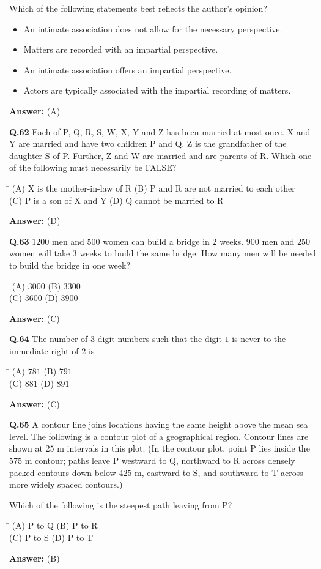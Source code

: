 \documentclass[11pt,a4paper]{article}
\newcommand{\optsfourA}[4]{%
  \begin{tabbing}
    \hspace{0.48\linewidth}\=\kill
    (A) #1 \> (B) #2 \\[2pt]
    (C) #3 \> (D) #4
  \end{tabbing}%
}
\newcommand{\optslistA}[4]{%
  \begin{itemize}
    \setlength{\itemsep}{2pt}\setlength{\parskip}{0pt}
    \item[(A)] #1
    \item[(B)] #2
    \item[(C)] #3
    \item[(D)] #4
  \end{itemize}%
}
\newcommand{\ans}[1]{\textbf{Answer:} #1\par\medskip}
\begin{document}
Which of the following statements best reflects the author's opinion?
\optslistA{An intimate association does not allow for the necessary perspective.}{Matters are recorded with an impartial perspective.}{An intimate association offers an impartial perspective.}{Actors are typically associated with the impartial recording of matters.}
\ans{(A)}

\textbf{Q.62} Each of P, Q, R, S, W, X, Y and Z has been married at most once. X and Y are married and have two children P and Q. Z is the grandfather of the daughter S of P. Further, Z and W are married and are parents of R. Which one of the following must necessarily be FALSE?
\optsfourA{X is the mother-in-law of R}{P and R are not married to each other}{P is a son of X and Y}{Q cannot be married to R}
\ans{(D)}

\textbf{Q.63} $1200$ men and $500$ women can build a bridge in $2$ weeks. $900$ men and $250$ women will take $3$ weeks to build the same bridge. How many men will be needed to build the bridge in one week?
\optsfourA{$3000$}{$3300$}{$3600$}{$3900$}
\ans{(C)}

\textbf{Q.64} The number of $3$-digit numbers such that the digit $1$ is never to the immediate right of $2$ is
\optsfourA{$781$}{$791$}{$881$}{$891$}
\ans{(C)}

\textbf{Q.65} A contour line joins locations having the same height above the mean sea level. The following is a contour plot of a geographical region. Contour lines are shown at $25\text{ m}$ intervals in this plot. (In the contour plot, point P lies inside the $575\text{ m}$ contour; paths leave P westward to Q, northward to R across densely packed contours down below $425\text{ m}$, eastward to S, and southward to T across more widely spaced contours.)

Which of the following is the steepest path leaving from P?
\optsfourA{P to Q}{P to R}{P to S}{P to T}
\ans{(B)}
\end{document}
